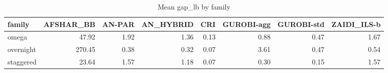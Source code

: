 \begin{table}[htbp]
\centering
\small
\caption{Mean gap\_lb by family}
\label{tab:E10b_state_of_the_art_60s_b60_by_family}
\begin{tabular}{lrrrrrrr}
\toprule
family & AFSHAR\_BB & AN-PAR & AN\_HYBRID & CRI & GUROBI-agg & GUROBI-std & ZAIDI\_ILS-b \\
\midrule
omega & 47.92 & 1.92 & 1.36 & 0.13 & 0.88 & 0.47 & 1.67 \\
overnight & 270.45 & 0.38 & 0.32 & 0.07 & 3.61 & 0.47 & 0.54 \\
staggered & 23.64 & 1.57 & 1.18 & 0.07 & 0.30 & 0.15 & 1.57 \\
\bottomrule
\end{tabular}
\end{table}
